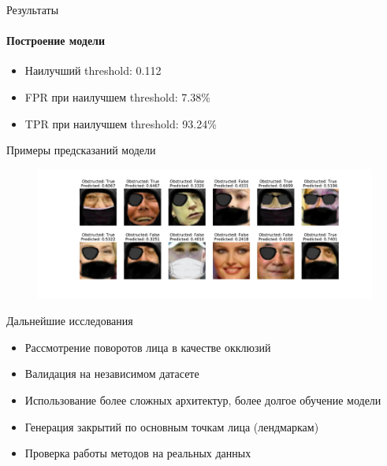\documentclass{beamer}
\begin{document}

\begin{frame}{Результаты}
\framesubtitle{Построение модели}
\begin{itemize}
    \item Наилучший threshold: 0.112
    \item FPR при наилучшем threshold: 7.38\%
    \item TPR при наилучшем threshold: 93.24\%
\end{itemize}
Примеры предсказаний модели
\begin{figure}[h!]
    \centering
    \includegraphics[scale=0.23]{preds_demo.pdf}
\end{figure}
\end{frame}


\begin{frame}{Дальнейшие исследования}
\begin{itemize}
    \item Рассмотрение поворотов лица в качестве окклюзий
    \item Валидация на независимом датасете
    \item Использование более сложных архитектур, более долгое обучение модели
    \item Генерация закрытий по основным точкам лица (лендмаркам)
    \item Проверка работы методов на реальных данных
\end{itemize}
\end{frame}
\end{document}
